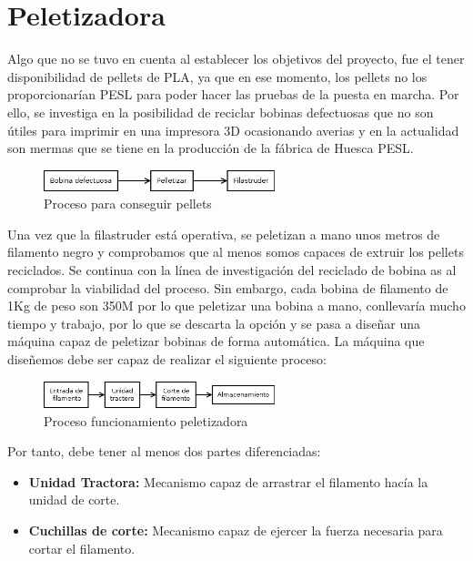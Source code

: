 
\chapter{Peletizadora}
\label{ane:peletizadora}

Algo que no se tuvo en cuenta al establecer los objetivos del proyecto, fue el tener disponibilidad de pellets de PLA, ya que en ese momento, los pellets no los proporcionarían PESL para poder hacer las pruebas de la puesta en marcha. Por ello, se investiga en la posibilidad de reciclar bobinas defectuosas que no son útiles para imprimir en una impresora 3D ocasionando averias y en la actualidad son mermas que se tiene en la producción de la fábrica de Huesca PESL.

\begin{figure}[H]
    \centering
    \includegraphics[width=0.6\textwidth]{images/peletizadora/Diagram.png}
    \caption{Proceso para conseguir pellets}
    \label{fig:peletizadora_diagram}
\end{figure}

Una vez que la filastruder está operativa, se peletizan a mano unos metros de filamento negro y comprobamos que al menos somos capaces de extruir los pellets reciclados. Se continua con la línea de investigación del reciclado de bobina as al comprobar la viabilidad del proceso. Sin embargo, cada bobina de filamento de 1Kg de peso son 350M por lo que peletizar una bobina a mano, conllevaría mucho tiempo y trabajo, por lo que se descarta la opción y se pasa a diseñar una máquina capaz de peletizar bobinas de forma automática. La máquina que diseñemos debe ser capaz de realizar el siguiente proceso:

\begin{figure}[H]
    \centering
    \includegraphics[width=0.6\textwidth]{images/peletizadora/Diagram2.png}
    \caption{Proceso funcionamiento peletizadora}
    \label{fig:peletizadora_diagram2}
\end{figure}

Por tanto, debe tener al menos dos partes diferenciadas:

\begin{itemize}
	\item{\textbf{Unidad Tractora:} Mecanismo capaz de arrastrar el filamento hacía la unidad de corte.}
	\item{\textbf{Cuchillas de corte:} Mecanismo capaz de ejercer la fuerza necesaria para cortar el filamento.}
\end{itemize}


